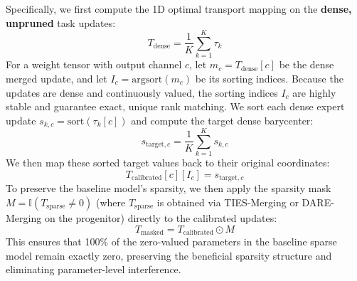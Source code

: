 \documentclass{article}
\theoremstyle{plain}
\theoremstyle{definition}
\theoremstyle{remark}
\begin{document}
Specifically, we first compute the 1D optimal transport mapping on the \textbf{dense, unpruned} task updates:
\begin{equation}
    T_{\text{dense}} = \frac{1}{K} \sum_{k=1}^K \tau_k
\end{equation}
For a weight tensor with output channel $c$, let $m_c = T_{\text{dense}}[c]$ be the dense merged update, and let $I_c = \text{argsort}(m_c)$ be its sorting indices. Because the updates are dense and continuously valued, the sorting indices $I_c$ are highly stable and guarantee exact, unique rank matching. We sort each dense expert update $s_{k,c} = \text{sort}(\tau_k[c])$ and compute the target dense barycenter:
\begin{equation}
    s_{\text{target},c} = \frac{1}{K} \sum_{k=1}^K s_{k,c}
\end{equation}
We then map these sorted target values back to their original coordinates:
\begin{equation}
    T_{\text{calibrated}}[c][I_c] = s_{\text{target},c}
\end{equation}
To preserve the baseline model's sparsity, we then apply the sparsity mask $M = \mathbb{I}(T_{\text{sparse}} \neq 0)$ (where $T_{\text{sparse}}$ is obtained via TIES-Merging or DARE-Merging on the progenitor) directly to the calibrated updates:
\begin{equation}
    T_{\text{masked}} = T_{\text{calibrated}} \odot M
\end{equation}
This ensures that 100\% of the zero-valued parameters in the baseline sparse model remain exactly zero, preserving the beneficial sparsity structure and eliminating parameter-level interference.
\end{document}
